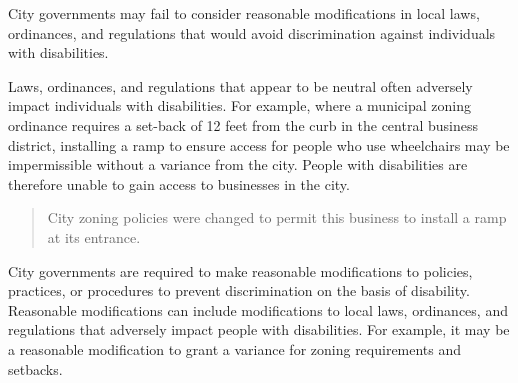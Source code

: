 

City governments may fail to consider reasonable modifications in local laws,
ordinances, and regulations that would avoid discrimination against individuals
with disabilities.


Laws, ordinances, and regulations that appear to be neutral often adversely
impact individuals with disabilities. For example, where a municipal zoning
ordinance requires a set-back of 12 feet from the curb in the central business
district, installing a ramp to ensure access for people who use wheelchairs may
be impermissible without a variance from the city. People with disabilities are
therefore unable to gain access to businesses in the city.

\begin{quote}
City zoning policies were changed to permit
this business to install a ramp at its entrance.
\end{quote}


City governments are required to make reasonable modifications to policies,
practices, or procedures to prevent discrimination on the basis of disability.
Reasonable modifications can include modifications to local laws, ordinances,
and regulations that adversely impact people with disabilities. For example, it
may be a reasonable modification to grant a variance for zoning requirements and
setbacks. 

